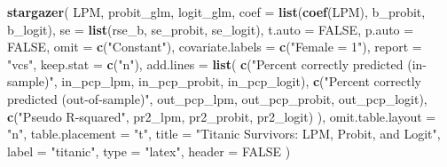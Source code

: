 \documentclass[
  12pt,
]{article}
\newenvironment{Shaded}{\begin{snugshade}}{\end{snugshade}}
\newcommand{\DataTypeTok}[1]{\textcolor[rgb]{0.13,0.29,0.53}{#1}}
\newcommand{\KeywordTok}[1]{\textcolor[rgb]{0.13,0.29,0.53}{\textbf{#1}}}
\newcommand{\NormalTok}[1]{#1}
\newcommand{\OtherTok}[1]{\textcolor[rgb]{0.56,0.35,0.01}{#1}}
\newcommand{\StringTok}[1]{\textcolor[rgb]{0.31,0.60,0.02}{#1}}
\begin{document}
\begin{Shaded}
\begin{Highlighting}[]
\KeywordTok{stargazer}\NormalTok{(}
\NormalTok{  LPM, probit\_glm, logit\_glm,}
  \DataTypeTok{coef =} \KeywordTok{list}\NormalTok{(}\KeywordTok{coef}\NormalTok{(LPM), b\_probit, b\_logit),}
  \DataTypeTok{se =} \KeywordTok{list}\NormalTok{(rse\_b, se\_probit, se\_logit),}
  \DataTypeTok{t.auto =} \OtherTok{FALSE}\NormalTok{, }\DataTypeTok{p.auto =} \OtherTok{FALSE}\NormalTok{,}
  \DataTypeTok{omit =} \KeywordTok{c}\NormalTok{(}\StringTok{"Constant"}\NormalTok{), }\DataTypeTok{covariate.labels =} \KeywordTok{c}\NormalTok{(}\StringTok{"Female = 1"}\NormalTok{),}
  \DataTypeTok{report =} \StringTok{"vcs"}\NormalTok{, }\DataTypeTok{keep.stat =} \KeywordTok{c}\NormalTok{(}\StringTok{"n"}\NormalTok{),}
  \DataTypeTok{add.lines =} \KeywordTok{list}\NormalTok{(}
    \KeywordTok{c}\NormalTok{(}\StringTok{"Percent correctly predicted (in{-}sample)"}\NormalTok{, }
\NormalTok{      in\_pcp\_lpm, in\_pcp\_probit, in\_pcp\_logit),}
    \KeywordTok{c}\NormalTok{(}\StringTok{"Percent correctly predicted (out{-}of{-}sample)"}\NormalTok{,}
\NormalTok{      out\_pcp\_lpm, out\_pcp\_probit, out\_pcp\_logit),}
    \KeywordTok{c}\NormalTok{(}\StringTok{"Pseudo R{-}squared"}\NormalTok{, pr2\_lpm, pr2\_probit, pr2\_logit)}
\NormalTok{  ),}
  \DataTypeTok{omit.table.layout =} \StringTok{"n"}\NormalTok{, }\DataTypeTok{table.placement =} \StringTok{"t"}\NormalTok{,}
  \DataTypeTok{title =} \StringTok{"Titanic Survivors: LPM, Probit, and Logit"}\NormalTok{,}
  \DataTypeTok{label =} \StringTok{"titanic"}\NormalTok{,}
  \DataTypeTok{type =} \StringTok{"latex"}\NormalTok{, }\DataTypeTok{header =} \OtherTok{FALSE}
\NormalTok{)}
\end{Highlighting}
\end{Shaded}
\end{document}
